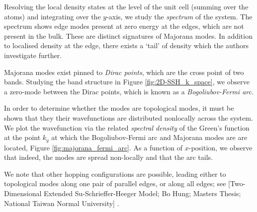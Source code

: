 
Resolving the local density states at the level of the unit cell (summing over the atoms) and integrating over the $y$-axis, we study the {\it spectrum} of the system. 
The spectrum shows edge modes present at zero energy at the edges, which are not present in the bulk. These are distinct signatures of Majorana modes. 
In addition to localised density at the edge, there exists a `tail' of density which the authors investigate further.


Majorana modes exist pinned to {\it Dirac points}, which are the cross point of two bands. 
Studying the band structure in Figure \ref{fig:2D-SSH_k_space}, we observe a zero-mode between the Dirac points, which is known as a {\it Bogoliubov-Fermi arc}. 


In order to determine whether the modes are topological modes, it must be shown that they their wavefunctions are distributed nonlocally across the system.
We plot the wavefunction via the related {\it spectral density} of the Green's function at the point $k_y$ at which the Bogoliubov-Fermi arc and Majorana modes are are located, Figure \ref{fig:majorana_fermi_arc}.
As a function of $x$-position, we observe that indeed, the modes are spread non-locally and that the arc tails.


We note that other hopping configurations are possible, leading either to topological modes along one pair of parallel edges, or along all edges; see 
[Two-Dimensional Extended Su-Schrieffer-Heeger Model; Bo Hung; Masters Thesis; National Taiwan Normal University] 
.

